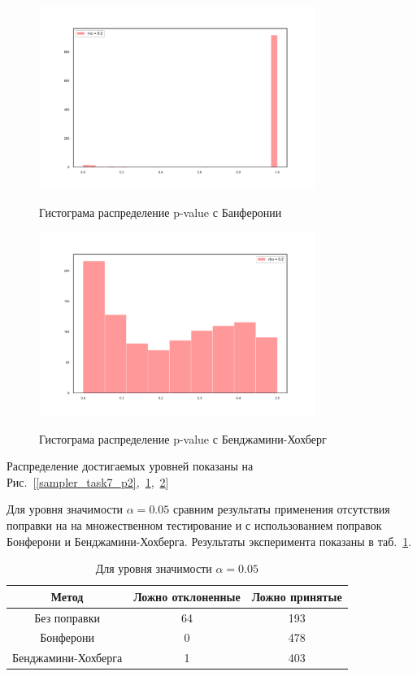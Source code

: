 \documentclass[12pt, twoside]{article}
\begin{document}
\begin{figure}[h!]\center
{\includegraphics[width=0.8\textwidth]{sampler_task7_p3}}
\caption{Гистограма распределение p-value с Банферонии}
\label{sampler_task7_p3}
\end{figure}

\begin{figure}[h!]\center
{\includegraphics[width=0.8\textwidth]{sampler_task7_p4}}
\caption{Гистограма распределение p-value с Бенджамини-Хохберг}
\label{sampler_task7_p4}
\end{figure}

Распределение достигаемых уровней показаны на Рис.~[\ref{sampler_task7_p2},~\ref{sampler_task7_p3},~\ref{sampler_task7_p4}]

Для уровня значимости $\alpha = 0.05$ сравним результаты применения отсутствия поправки на на множественном тестирование и с использованием поправок Бонферони и Бенджамини-Хохберга. Результаты эксперимента показаны в таб.~\ref{table2}.

\begin{table}[h!]
\begin{center}
\begin{tabular}{|c|c|c|}
\hline
	Метод&Ложно отклоненные& Ложно принятые\\
	\hline
	Без поправки &  64 & 193 \\
	\hline
	Бонферони & 0 & 478\\
	\hline
	Бенджамини-Хохберга& 1 & 403\\
\hline
\end{tabular}
\end{center}
\caption{Для уровня значимости $\alpha = 0.05$}
\label{table2}
\end{table}
\end{document}

